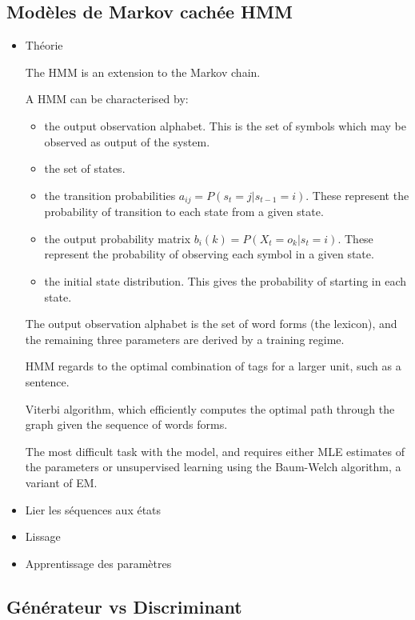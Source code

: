 \documentclass[a4paper]{article}
\begin{document}
\subsection{Modèles de Markov cachée HMM}
\begin{itemize}
\item Théorie

The HMM is an extension to the Markov chain.



A HMM can be characterised by:
\begin{itemize}
\item the output observation alphabet. This is the set of symbols which may be observed as output of the system.
\item the set of states.
\item the transition probabilities $a_{ij} = P(s_t = j | s_{t-1} = i)$. These represent the probability of transition to each state from a given state.
\item the output probability matrix $b_i(k) = P(X_t = o_k | s_t = i)$. These represent the probability of observing each symbol in a given state.
\item the initial state distribution. This gives the probability of starting in each state.
\end{itemize}

The output observation alphabet is the set of word forms (the lexicon), and the 
remaining three parameters are derived by a training regime.

HMM regards to the optimal combination of tags for a larger unit, such as a sentence.

Viterbi algorithm, which efficiently computes the optimal path through the graph given the sequence of words forms.

The most difficult task with the model, and requires either MLE estimates of the parameters or unsupervised learning using the Baum-Welch algorithm, a variant of EM.


\item Lier les séquences aux états
\item Lissage
\item Apprentissage des paramètres
\end{itemize}


\subsection{Générateur vs Discriminant}
\end{document}
